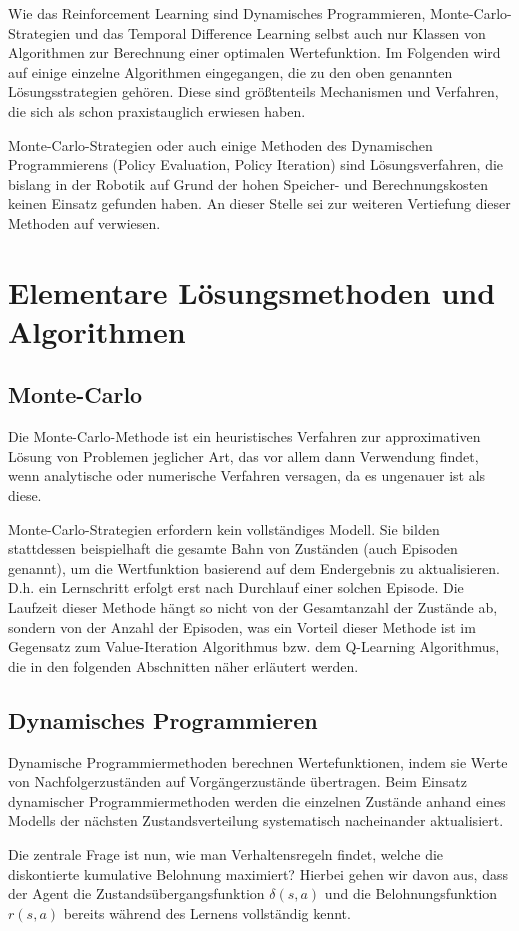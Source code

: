 Wie das Reinforcement Learning sind Dynamisches Programmieren, 
Monte-Carlo-Strategien und das Temporal Difference Learning selbst auch nur 
Klassen von Algorithmen zur Berechnung einer optimalen Wertefunktion. Im 
Folgenden wird auf einige einzelne Algorithmen eingegangen, die zu den oben 
genannten Lösungsstrategien gehören. Diese sind größtenteils Mechanismen und 
Verfahren, die sich als schon praxistauglich erwiesen haben.
\par Monte-Carlo-Strategien oder auch einige Methoden des Dynamischen 
Programmierens (Policy Evaluation, Policy Iteration) sind Lösungsverfahren, die 
bislang in der Robotik auf Grund der hohen Speicher- und Berechnungskosten 
keinen Einsatz gefunden haben. An dieser Stelle sei zur weiteren Vertiefung
dieser Methoden auf \cite{Sutton1998} verwiesen.

\section{Elementare Lösungsmethoden und Algorithmen}
\subsection{Monte-Carlo}
Die Monte-Carlo-Methode ist ein heuristisches Verfahren zur approximativen 
Lösung von Problemen jeglicher Art, das vor allem dann Verwendung findet, wenn 
analytische oder numerische Verfahren versagen, da es ungenauer ist als diese. 
\par Monte-Carlo-Strategien erfordern kein vollständiges Modell. Sie bilden 
stattdessen beispielhaft die gesamte Bahn von Zuständen (auch Episoden genannt), um die
Wertfunktion basierend auf dem Endergebnis zu aktualisieren. D.h. ein 
Lernschritt erfolgt erst nach Durchlauf einer solchen Episode. Die Laufzeit
dieser Methode hängt so nicht von der Gesamtanzahl der Zustände ab, sondern von
der Anzahl der Episoden, was ein Vorteil dieser Methode ist im Gegensatz zum
Value-Iteration Algorithmus bzw. dem Q-Learning Algorithmus, die in den
folgenden Abschnitten näher erläutert werden.

\subsection{Dynamisches Programmieren}
Dynamische Programmiermethoden berechnen Wertefunktionen, indem sie Werte von 
Nachfolgerzuständen auf Vorgängerzustände übertragen. Beim Einsatz dynamischer 
Programmiermethoden werden die einzelnen Zustände anhand eines Modells der 
nächsten Zustandsverteilung systematisch nacheinander aktualisiert. 
\par Die zentrale Frage ist nun, wie man Verhaltensregeln findet, welche die 
diskontierte kumulative Belohnung maximiert? Hierbei gehen wir davon aus, dass 
der Agent die Zustandsübergangsfunktion $\delta(s,a)$ und die 
Belohnungsfunktion $r(s,a)$ bereits während des Lernens vollständig kennt.

